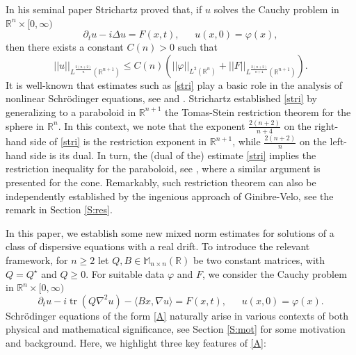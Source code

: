 \documentclass[11pt,letter]{amsart}
\def \R {\mathbb{R}}
\def \vf{\varphi}
\newcommand{\Rn}{\mathbb R^n}
\newcommand{\p}{\partial}
\numberwithin{equation}{section}
\newcommand{\tr}{\operatorname{tr}}
\newcommand{\sa}{\langle}
\newcommand{\da}{\rangle}
\numberwithin{equation}{section}
\begin{document}
In his seminal paper \cite[Cor.1]{Stri} Strichartz proved that, if $u$ solves the Cauchy problem in $\Rn\times [0,\infty)$
\begin{equation}\label{CPs}
\p_t u - i \Delta u = F(x,t),\ \ \ \ \ \ \ u(x,0) = \vf(x),
\end{equation}
then there exists a constant $C(n)>0$ such that
\begin{equation}\label{stri}
||u||_{L^{\frac{2(n+2)}n}(\R^{n+1})} \le C(n) \left(||\vf||_{L^2(\Rn)} + ||F||_{L^{\frac{2(n+2)}{n+4}}(\R^{n+1})}\right).
\end{equation}
It is well-known that estimates such as \eqref{stri} play a basic role in the analysis of nonlinear Schr\"odinger equations, see \cite{Caze} and \cite{Tao}. Strichartz established \eqref{stri} by generalizing to a paraboloid in $\R^{n+1}$ the Tomas-Stein restriction theorem for the sphere in $\Rn$. In this context, we note that the exponent $\frac{2(n+2)}{n+4}$ on the right-hand side of \eqref{stri} is the restriction exponent in $\R^{n+1}$, while $\frac{2(n+2)}{n}$ on the left-hand side is its dual. In turn, the (dual of the) estimate \eqref{stri} implies the restriction inequality for the paraboloid, see \cite[pp.100-101]{Sogge}, where a similar argument is presented for the cone. Remarkably, such restriction theorem can also be independently established by the ingenious approach of Ginibre-Velo, see the remark in Section \ref{S:res}.    

In this paper, we establish some new mixed norm estimates for solutions of a class of dispersive equations with a real drift. To introduce the relevant framework, for $n\ge 2$ let $Q, B \in \mathbb M_{n\times n}(\R)$ be two constant matrices, with $Q = Q^\star$ and $Q\ge 0$. For suitable data $\vf$ and $F$, we consider the Cauchy problem  in $\Rn\times [0,\infty)$
\begin{equation}\label{A}
\p_t u - i \tr(Q\nabla^2 u) -  \sa Bx,\nabla u\da   = F(x,t),\ \ \ \ \ \ \ u(x,0) = \vf(x).
\end{equation}
Schr\"odinger equations of the form \eqref{A} naturally arise in various contexts of both physical and mathematical significance, see Section \ref{S:mot} for some motivation and background. Here, we highlight three key features of \eqref{A}:
\end{document}
